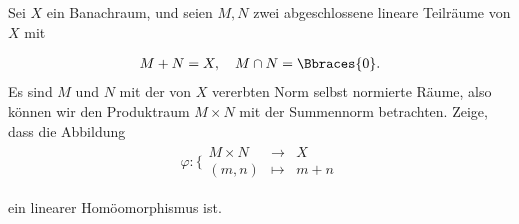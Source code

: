 \begin{exercise}

Sei $X$ ein Banachraum, und seien $M,N$ zwei abgeschlossene lineare Teilräume von $X$ mit

\begin{align*}
  M + N = X, \quad M \cap N = \Bbraces{0}.
\end{align*}
Es sind $M$ und $N$ mit der von $X$ vererbten Norm selbst normierte Räume, also
können wir den Produktraum $M \times N$ mit der Summennorm betrachten. Zeige,
dass die Abbildung
\begin{align*}
  \varphi:
  \bigg \{
  \begin{matrix}
    M \times N & \rightarrow & X \\
    (m, n)     & \mapsto     & m + n
  \end{matrix}
\end{align*}

ein linearer Homöomorphismus ist.

\end{exercise}

